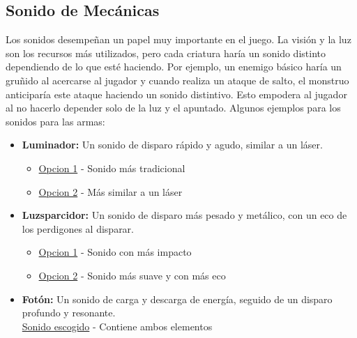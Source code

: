     \subsection{Sonido de Mecánicas}
        Los sonidos desempeñan un papel muy importante en el juego. La visión y la luz son los recursos más utilizados, pero cada criatura haría un sonido distinto dependiendo de lo que esté haciendo. Por ejemplo, un enemigo básico haría un gruñido al acercarse al jugador y cuando realiza un ataque de salto, el monstruo anticiparía este ataque haciendo un sonido distintivo. Esto empodera al jugador al no hacerlo depender solo de la luz y el apuntado.
        Algunos ejemplos para los sonidos para las armas:
        \begin{itemize}
            \item \textbf{Luminador:} Un sonido de disparo rápido y agudo, similar a un láser.
            \begin{itemize}
                \item \href{https://drive.google.com/open?id=1--GmmPExYlCoyFkUiGgEEhoB6ZvPko4W&usp=drive_fs}{Opcion 1} - Sonido más tradicional
                \item \href{https://drive.google.com/open?id=1-8QOVx0icIXQ2tiE5wcexUUpAmHtnrhO&usp=drive_fs}{Opcion 2} - Más similar a un láser
            \end{itemize}
            \item \textbf{Luzsparcidor:} Un sonido de disparo más pesado y metálico, con un eco de los perdigones al disparar.
            \begin{itemize}
                \item \href{https://drive.google.com/open?id=1ePwIRZERfeH8iIn4U1qDEDvSef1qM3Ja&usp=drive_fs}{Opcion 1} - Sonido con más impacto
                \item \href{https://drive.google.com/open?id=1d05kAcgOKx4CygJESJ_SjWyzid2VOUDn&usp=drive_fs}{Opcion 2} - Sonido más suave y con más eco
            \end{itemize}
            \item \textbf{Fotón:} Un sonido de carga y descarga de energía, seguido de un disparo profundo y resonante.\\
                \href{https://drive.google.com/open?id=1-6RLC8SU9PWc3WL4-Esuh9aY8DqgYpkp&usp=drive_fs}{Sonido escogido} - Contiene ambos elementos
        \end{itemize}


